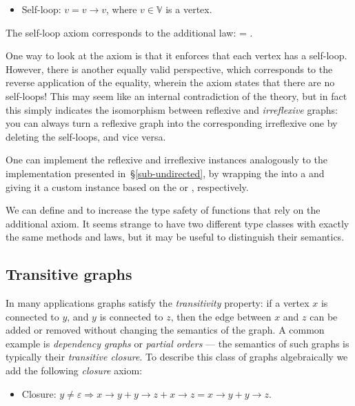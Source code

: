 \begin{itemize}
    \item Self-loop: $v = v \rightarrow v$, where $v\in \mathbb{V}$ is a vertex.
\end{itemize}

\noindent
The self-loop axiom corresponds to the additional  law:
 = .

One way to look at the axiom is that it enforces that each vertex has a self-loop. However,
there is another equally valid perspective, which corresponds to the reverse application
of the equality, wherein the axiom states that there are no self-loops! This may seem like an
internal contradiction of the theory, but in fact this simply indicates the isomorphism
between reflexive and \emph{irreflexive} graphs: you can always
turn a reflexive graph into the corresponding irreflexive one by deleting the self-loops,
and vice versa.

One can implement the reflexive and irreflexive  instances analogously to
the  implementation presented in~\S\ref{sub-undirected}, by wrapping the
 into a  and giving it a custom  instance based on the
 or , respectively.

We can define
 and
to increase the type safety of functions that rely on the additional axiom. It seems
strange to have two different type classes with exactly the same methods and laws, but
it may be useful to distinguish their semantics.

\subsection{Transitive graphs}\label{sub-transitive}

In many applications graphs satisfy the \emph{transitivity} property: if a vertex $x$ is
connected to $y$, and $y$ is connected to $z$, then the edge between $x$ and $z$ can be
added or removed without changing the semantics of the graph. A common example is
\emph{dependency graphs} or \emph{partial orders} --- the semantics of such graphs is
typically their \emph{transitive closure}.
To describe this class of graphs algebraically we add the following \emph{closure} axiom:

\begin{itemize}
    \item Closure: $y \neq \varepsilon \Rightarrow x \rightarrow y + y \rightarrow z +
    x \rightarrow z = x \rightarrow y + y \rightarrow z$.
\end{itemize}

